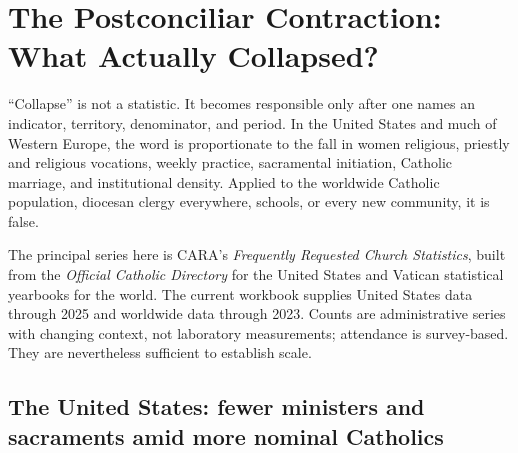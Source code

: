 \section{The Postconciliar Contraction: What Actually Collapsed?}

“Collapse” is not a statistic. It becomes responsible only after one names an indicator, territory, denominator, and period. In the United States and much of Western Europe, the word is proportionate to the fall in women religious, priestly and religious vocations, weekly practice, sacramental initiation, Catholic marriage, and institutional density. Applied to the worldwide Catholic population, diocesan clergy everywhere, schools, or every new community, it is false.

The principal series here is CARA's \emph{Frequently Requested Church Statistics}, built from the \emph{Official Catholic Directory} for the United States and Vatican statistical yearbooks for the world. The current workbook supplies United States data through 2025 and worldwide data through 2023. Counts are administrative series with changing context, not laboratory measurements; attendance is survey-based. They are nevertheless sufficient to establish scale.

\subsection{The United States: fewer ministers and sacraments amid more nominal Catholics}

